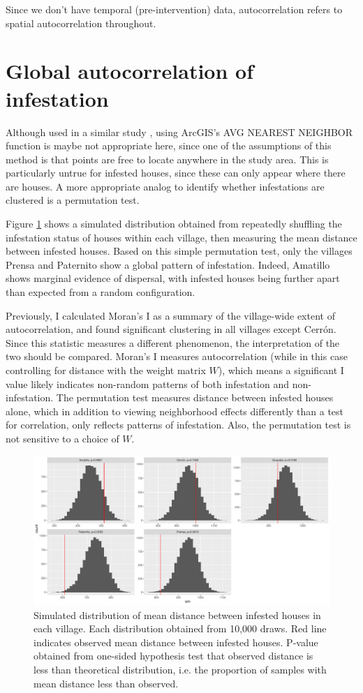 \documentclass{scrartcl}
\begin{document}
Since we don't have temporal (pre-intervention) data, autocorrelation
refers to spatial autocorrelation throughout.

\section{Global autocorrelation of infestation}
\label{sec:glob-autoc-infest}

Although used in a similar study \cite{Lucero2013}, using ArcGIS's AVG
NEAREST NEIGHBOR function is maybe not appropriate here, since one of
the assumptions of this method is that points are free to locate
anywhere in the study area. This is particularly untrue for infested
houses, since these can only appear where there are houses. A more
appropriate analog to identify whether infestations are clustered is a
permutation test.

Figure \ref{fig:perm-test} shows a simulated distribution obtained
from repeatedly shuffling the infestation status of houses within each
village, then measuring the mean distance between infested
houses. Based on this simple permutation test, only the villages
Prensa and Paternito show a global pattern of infestation. Indeed,
Amatillo shows marginal evidence of dispersal, with infested houses
being further apart than expected from a random configuration.

Previously, I calculated Moran's I as a summary of the village-wide
extent of autocorrelation, and found significant clustering in all
villages except Cerr\'on. Since this statistic measures a different
phenomenon, the interpretation of the two should be compared. Moran's
I measures autocorrelation (while in this case controlling for
distance with the weight matrix $W$), which means a significant I
value likely indicates non-random patterns of both infestation and
non-infestation. The permutation test measures distance between
infested houses alone, which in addition to viewing neighborhood
effects differently than a test for correlation, only reflects
patterns of infestation. Also, the permutation test is not sensitive
to a choice of $W$.

\begin{figure}
  \centering
  \includegraphics[width=.7\linewidth]{perm-test}
  \caption{Simulated distribution of mean distance between infested
    houses in each village. Each distribution obtained from 10,000
    draws. Red line indicates observed mean distance between infested
    houses. P-value obtained from one-sided hypothesis test that
    observed distance is less than theoretical distribution, i.e. the
    proportion of samples with mean distance less than observed.}
  \label{fig:perm-test}
\end{figure}
\end{document}
